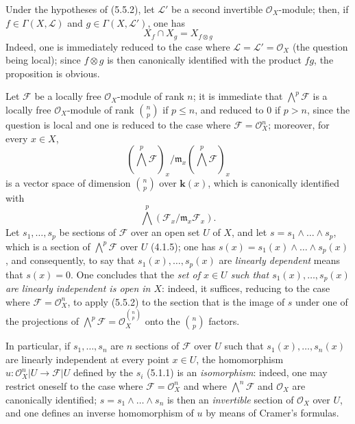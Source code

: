 \begin{env}[5.5.3]
\label{0.5.5.3}
Under the hypotheses of (5.5.2), let $\mathcal{L}'$ be a second invertible
$\mathcal{O}_X$-module; then, if
$f\in\Gamma(X,\mathcal{L})$ and $g\in\Gamma(X,\mathcal{L}')$, one has
\[
  X_f\cap X_g=X_{f\otimes g}
\]
Indeed, one is immediately reduced to the case where
$\mathcal{L}=\mathcal{L}'=\mathcal{O}_X$ (the question being local); since
$f\otimes g$ is then canonically identified with the product $fg$, the proposition
is obvious.
\end{env}


\begin{env}[5.5.4]
\label{0.5.5.4}
Let $\mathcal{F}$ be a locally free $\mathcal{O}_X$-module of rank $n$;
it is immediate that $\bigwedge^p\mathcal{F}$ is a locally free
$\mathcal{O}_X$-module of rank $\binom{n}{p}$ if $p\leq n$, and reduced to $0$ if $p>n$,
since the question is local and one is reduced to the case where
$\mathcal{F}=\mathcal{O}_X^n$; moreover, for every $x\in X$,
\[
  (\bigwedge^p\mathcal{F})_x/
  \mathfrak{m}_x(\bigwedge^p\mathcal{F})_x
\]
is a vector space of dimension $\binom{n}{p}$ over $\boldsymbol{k}(x)$, which
is canonically identified with
\[
  \bigwedge^p(\mathcal{F}_x/\mathfrak{m}_x\mathcal{F}_x).
\]
Let
$s_1,\ldots,s_p$ be sections of $\mathcal{F}$ over an open set $U$ of $X$, and
let $s=s_1\wedge\ldots\wedge s_p$, which is a section of
$\bigwedge^p\mathcal{F}$ over $U$ (4.1.5); one has
$s(x)=s_1(x)\wedge\ldots\wedge s_p(x)$, and consequently, to say that
$s_1(x),\ldots,s_p(x)$ are \emph{linearly dependent} means that
$s(x)=0$. One concludes that the \emph{set of $x\in U$ such that
$s_1(x),\ldots,s_p(x)$ are linearly independent is open in
$X$}: indeed, it suffices, reducing to the case where
$\mathcal{F}=\mathcal{O}_X^n$, to apply (5.5.2) to the section that is the image of $s$
under one of the projections of
$\bigwedge^p\mathcal{F}=\mathcal{O}_X^{\binom{n}{p}}$ onto the
$\binom{n}{p}$ factors.

In particular, if $s_1,\ldots,s_n$ are $n$ sections of $\mathcal{F}$
over $U$ such that $s_1(x),\ldots,s_n(x)$ are linearly
independent at every point $x\in U$, the homomorphism
$u:\mathcal{O}_X^n|U\to\mathcal{F}|U$ defined by the $s_i$ (5.1.1) is an
\emph{isomorphism}: indeed, one may restrict oneself to the case where
$\mathcal{F}=\mathcal{O}_X^n$ and where
$\bigwedge^n\mathcal{F}$ and $\mathcal{O}_X$ are canonically identified;
$s=s_1\wedge\ldots\wedge s_n$ is then an \emph{invertible} section of $\mathcal{O}_X$
over $U$, and one defines an inverse homomorphism
of $u$ by means of Cramer's formulas.
\end{env}

